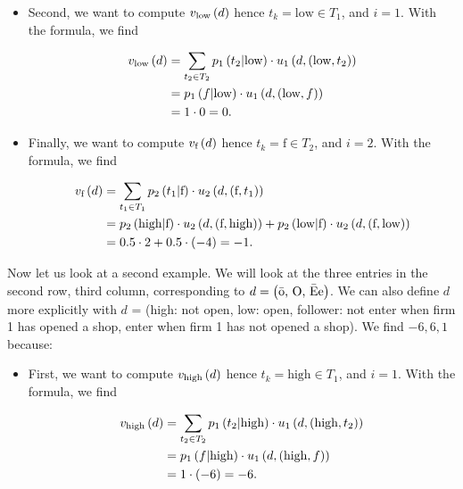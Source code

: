 \begin{enumerate}[label=\alph*.]
\begin{itemize}
     \item Second, we want to compute $v_{\text{low}} \left(d\right)$ hence $t_{k} = \text{low} \in T_1$, and $i = 1$. With the formula, we find

     \begin{align*}
         v_{\text{low}} \left(d\right)
        & = \sum_{t_{2} \in T_{2}} p_{1} \left(t_{2}|\text{low}\right) \cdot u_{1} \left(d, (\text{low}, t_{2})\right) \\
        & = p_{1} \left(f|\text{low}\right) \cdot u_{1} \left(d, (\text{low}, f)\right) \\
        & = 1 \cdot 0 = 0.
     \end{align*}

     \item Finally, we want to compute $v_{\text{f}} \left(d\right)$ hence $t_{k} = \text{f} \in T_2$, and $i = 2$. With the formula, we find

     \begin{align*}
         v_{\text{f}} \left(d\right)
        & = \sum_{t_{1} \in T_{1}} p_2 \left(t_{1}|\text{f}\right) \cdot u_{2} \left(d, (\text{f}, t_{1})\right) \\
        & = p_2 \left(\text{high}|\text{f}\right) \cdot u_{2} \left(d, (\text{f}, \text{high})\right)
        + p_2 \left(\text{low}|\text{f}\right) \cdot u_{2} \left(d, (\text{f}, \text{low})\right) \\
        & = 0.5 \cdot 2 + 0.5 \cdot (-4) = -1.
     \end{align*}
\end{itemize}



Now let us look at a second example. We will look at the three entries in the second row, third column, corresponding to $d = \left(\text{\=o, O, \=Ee}\right)$. We can also define $d$ more explicitly with $d$ = (high: not open, low: open, follower: not enter when firm 1 has opened a shop, enter when firm 1 has not opened a shop). We find $-6, 6, 1$ because:
\begin{itemize}
     \item First, we want to compute $v_{\text{high}} \left(d\right)$ hence $t_{k} = \text{high} \in T_1$, and $i = 1$. With the formula, we find

     \begin{align*}
         v_{\text{high}} \left(d\right)
        & = \sum_{t_{2} \in T_{2}} p_{1} \left(t_{2}|\text{high}\right) \cdot u_{1} \left(d, (\text{high}, t_{2})\right) \\
        & = p_{1} \left(f|\text{high}\right) \cdot u_{1} \left(d, (\text{high}, f)\right) \\
        & = 1 \cdot (- 6) = -6.
     \end{align*}


\end{itemize}
\end{enumerate}
